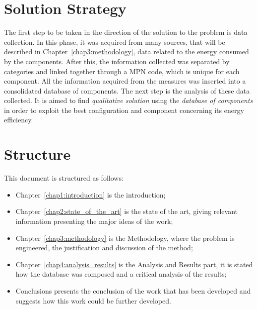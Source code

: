 \section{Solution Strategy} \label{sec1:solution_strategy}
    The first step to be taken in the direction of the solution to the problem is data collection. In this phase, it was acquired from many sources, that will be described in Chapter~\ref{chap3:methodology}, data related to the energy consumed by the components. After this, the information collected was separated by categories and linked together through a MPN code, which is unique for each component. All the information acquired from the measures was inserted into a consolidated database of components. The next step is the analysis of these data collected. It is aimed to find \emph{qualitative solution} using the \emph{database of components} in order to exploit the best configuration and component concerning its energy efficiency.

\section{Structure} \label{sec1:structure}
    This document is structured as follows:
    \begin{itemize}
        \item Chapter~\ref{chap1:introduction} is the introduction;
        \item Chapter~\ref{chap2:state_of_the_art} is the state of the art, giving relevant information presenting the major ideas of the work;
        \item Chapter~\ref{chap3:methodology} is the Methodology, where the problem is engineered, the justification and discussion of the method;
        \item Chapter~\ref{chap4:analysis_results} is the Analysis and Results part, it is stated how the database was composed and a critical analysis of the results;
        \item Conclusions presents the conclusion of the work that has been developed and suggests how this work could be further developed.

    \end{itemize}
    
    
